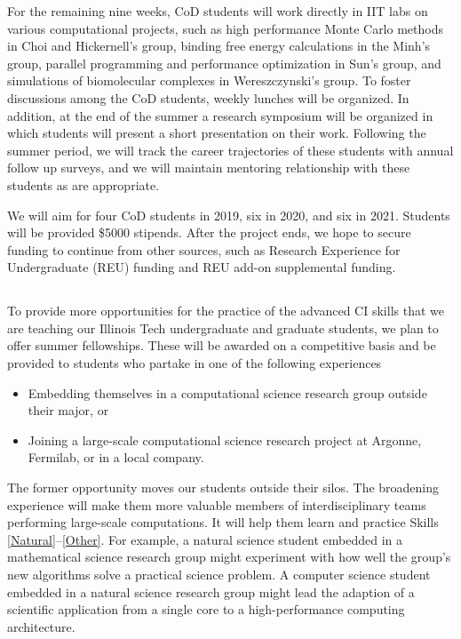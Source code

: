 \documentclass[11pt]{NSFamsart}
\begin{document}
For the remaining nine weeks, CoD students will work directly in IIT labs on various computational projects, such as high performance Monte Carlo methods in Choi and Hickernell's group, binding free energy calculations in the Minh's group, parallel programming and performance optimization in Sun's group, and simulations of biomolecular complexes in  Wereszczynski's group.  To foster discussions among the CoD students, weekly lunches will be organized.  In addition, at the end of the summer a research symposium will be organized in which students will present a short presentation on their work.  Following the summer period, we will track the career trajectories of these students with annual follow up surveys, and we will maintain mentoring relationship with these students as are appropriate. 

We will aim for four CoD students in 2019, six in 2020, and six in 2021.  Students will be provided \$5000 stipends.  After the project ends, we hope to secure funding to continue from other sources, such as Research Experience for Undergraduate (REU) funding and REU add-on supplemental funding.


\subsection{\FellowName} \label{Fellow}
To provide more opportunities for the practice of the advanced CI skills that we are teaching our Illinois Tech undergraduate and graduate students, we plan to offer summer fellowships.  These will be awarded on a competitive basis and be provided to students who partake in one of the following experiences
\begin{itemize}
\item Embedding themselves in a computational science research group outside their major, or
\item Joining a large-scale computational science research project at Argonne, Fermilab, or in a local company.
\end{itemize}

The former opportunity moves our students outside their silos.  The broadening experience will make them more valuable members of interdisciplinary teams performing large-scale computations.  It will help them learn and practice Skills \ref{Natural}--\ref{Other}.  For example, a natural science student embedded in a mathematical science research group might experiment with how well the group's new algorithms solve a practical science problem.  A computer science student embedded in a natural science research group might lead the adaption of a scientific application from a single core to a high-performance computing architecture. 
\end{document}
